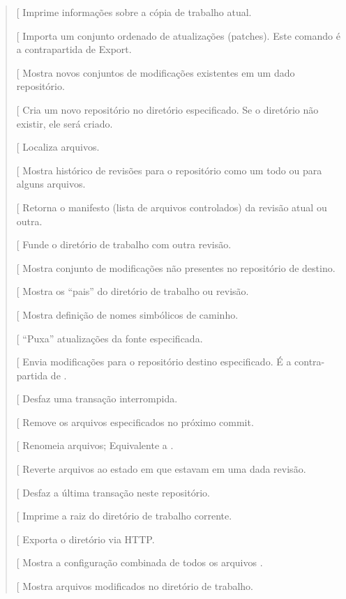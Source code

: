 \documentclass[a4paper,10pt,brazil]{sphinxmanual}
\begin{document}
\begin{quote}
{[}\code{identify}{]} Imprime informações sobre a cópia de trabalho
atual.

{[}\code{import}{]} Importa um conjunto ordenado de atualizações
(patches). Este comando é a contrapartida de Export.

{[}\code{incoming}{]} Mostra novos conjuntos de modificações existentes em
um dado repositório.

{[}\code{init}{]} Cria um novo repositório no diretório especificado. Se o
diretório não existir, ele será criado.

{[}\code{locate}{]} Localiza arquivos.

{[}\code{log}{]} Mostra histórico de revisões para o repositório como um
todo ou para alguns arquivos.

{[}\code{manifest}{]} Retorna o manifesto (lista de arquivos controlados)
da revisão atual ou outra.

{[}\code{merge}{]} Funde o diretório de trabalho com outra revisão.

{[}\code{outgoing}{]} Mostra conjunto de modificações não presentes no
repositório de destino.

{[}\code{parents}{]} Mostra os ``pais'' do diretório de trabalho ou
revisão.

{[}\code{paths}{]} Mostra definição de nomes simbólicos de caminho.

{[}\code{pull}{]} ``Puxa'' atualizações da fonte especificada.

{[}\code{push}{]} Envia modificações para o repositório destino
especificado. É a contra-partida de .

{[}\code{recover}{]} Desfaz uma transação interrompida.

{[}\code{remove}{]} Remove os arquivos especificados no próximo commit.

{[}\code{rename}{]} Renomeia arquivos; Equivalente a .

{[}\code{revert}{]} Reverte arquivos ao estado em que estavam em uma dada
revisão.

{[}\code{rollback}{]} Desfaz a última transação neste repositório.

{[}\code{root}{]} Imprime a raiz do diretório de trabalho corrente.

{[}\code{serve}{]} Exporta o diretório via HTTP.

{[}\code{showconfig}{]} Mostra a configuração combinada de todos os
arquivos .

{[}\code{status}{]} Mostra arquivos modificados no diretório de trabalho.


\end{quote}
\end{document}
